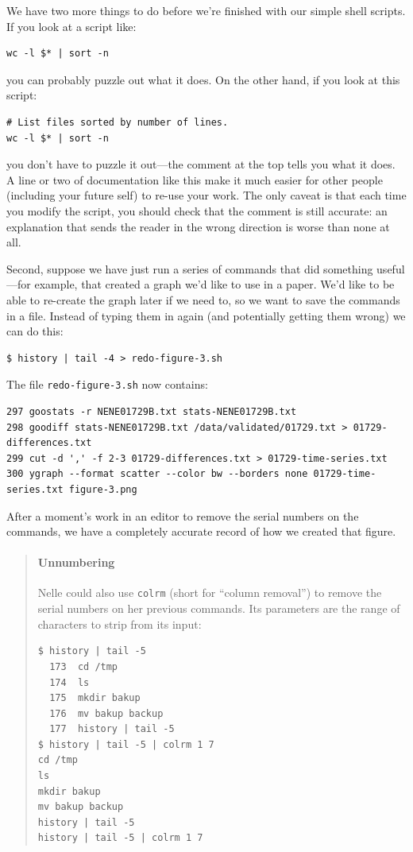 \documentclass{book}
\begin{document}
We have two more things to do before we're finished with our simple
shell scripts. If you look at a script like:

\begin{verbatim}
wc -l $* | sort -n
\end{verbatim}

you can probably puzzle out what it does. On the other hand, if you look
at this script:

\begin{verbatim}
# List files sorted by number of lines.
wc -l $* | sort -n
\end{verbatim}

you don't have to puzzle it out---the comment at the top tells you what
it does. A line or two of documentation like this make it much easier
for other people (including your future self) to re-use your work. The
only caveat is that each time you modify the script, you should check
that the comment is still accurate: an explanation that sends the reader
in the wrong direction is worse than none at all.

Second, suppose we have just run a series of commands that did something
useful---for example, that created a graph we'd like to use in a paper.
We'd like to be able to re-create the graph later if we need to, so we
want to save the commands in a file. Instead of typing them in again
(and potentially getting them wrong) we can do this:

\begin{verbatim}
$ history | tail -4 > redo-figure-3.sh
\end{verbatim}

The file \texttt{redo-figure-3.sh} now contains:

\begin{verbatim}
297 goostats -r NENE01729B.txt stats-NENE01729B.txt
298 goodiff stats-NENE01729B.txt /data/validated/01729.txt > 01729-differences.txt
299 cut -d ',' -f 2-3 01729-differences.txt > 01729-time-series.txt
300 ygraph --format scatter --color bw --borders none 01729-time-series.txt figure-3.png
\end{verbatim}

After a moment's work in an editor to remove the serial numbers on the
commands, we have a completely accurate record of how we created that
figure.

\begin{quote}
\mbox{}\paragraph{Unnumbering}

Nelle could also use \texttt{colrm} (short for ``column removal'') to
remove the serial numbers on her previous commands. Its parameters are
the range of characters to strip from its input:

\begin{verbatim}
$ history | tail -5
  173  cd /tmp
  174  ls
  175  mkdir bakup
  176  mv bakup backup
  177  history | tail -5
$ history | tail -5 | colrm 1 7
cd /tmp
ls
mkdir bakup
mv bakup backup
history | tail -5
history | tail -5 | colrm 1 7
\end{verbatim}
\end{quote}
\end{document}

